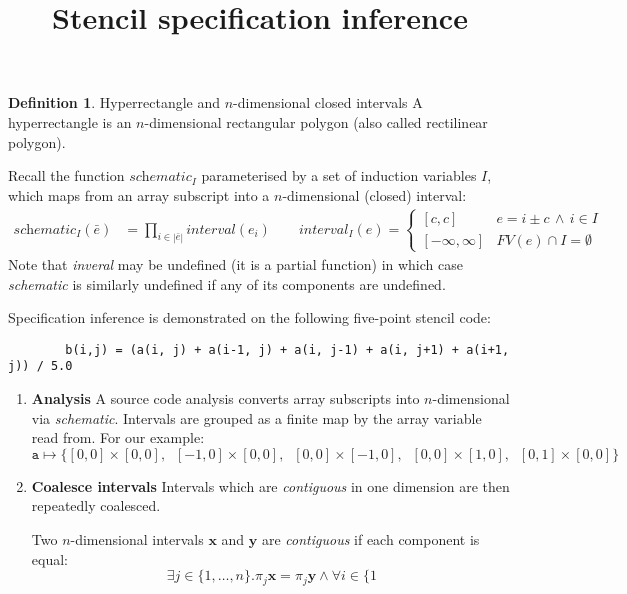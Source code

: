 \documentclass[acmlarge,review]{acmart}
\title{Stencil specification inference}
\newcommand{\vect}[1]{\textbf{#1}}
\theoremstyle{definition}
\newtheorem{defn}{Definition}
\theoremstyle{plain}
\theoremstyle{remark}
\begin{document}
\maketitle

\begin{defn}{Hyperrectangle and $n$-dimensional closed intervals}
A hyperrectangle is an $n$-dimensional rectangular polygon (also
called rectilinear polygon).
\end{defn}

\noindent
Recall the function $\textit{schematic}_I$ parameterised by
a set of induction variables $I$, which maps
from an array subscript into a $n$-dimensional (closed) interval:
%
\begin{align*}
\textit{schematic}_I(\bar{e}) & =
\prod_{i \in |\bar{e}|} \textit{interval}(e_i)
\qquad
\textit{interval}_I(e) = \begin{cases}
[c, c] & e = i \pm c \, \wedge \, i \in I \\
[-\infty, \infty] & FV(e) \cap I = \emptyset
\end{cases}
\end{align*}
Note that \textit{inveral} may be undefined (it is a partial function)
in which case \textit{schematic} is similarly undefined if any of its
components are undefined.

\noindent
Specification inference is demonstrated on the following five-point
stencil code:
%
\begin{center}
\begin{verbatim}
        b(i,j) = (a(i, j) + a(i-1, j) + a(i, j-1) + a(i, j+1) + a(i+1, j)) / 5.0
\end{verbatim}
\end{center}
%

\begin{enumerate}[leftmargin=1.5em]
\item \textbf{Analysis} A source code analysis converts array subscripts into
  $n$-dimensional via \textit{schematic}. Intervals are grouped as a
  finite map  by the array variable read from. For our example:
%
\begin{equation*}
\texttt{a} \mapsto \{[0,0]\times[0,0], \;\; [-1,0]\times[0,0], \;\;
[0,0]\times[-1,0], \;\; [0,0]\times[1,0], \;\; [0,1]\times[0,0]\}
\end{equation*}
%


\item \textbf{Coalesce intervals}
Intervals which are \emph{contiguous} in one dimension are then
repeatedly coalesced.

\begin{definition}
Two $n$-dimensional intervals $\vect{x}$ and $\vect{y}$ are
\emph{contiguous} if each component is equal:
%
\begin{equation*}
\exists j \in \{1, \ldots, n\} . \pi_j \vect{x} = \pi_j \vect{y}
\wedge \forall i \in \{1
\end{equation*}
%
\end{definition}

\end{enumerate}
\end{document}
